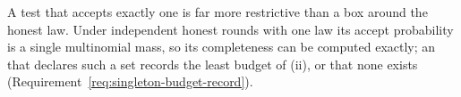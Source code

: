 
A test that accepts exactly one  is far more
restrictive than a box around the honest law. Under independent honest
rounds with one law its accept probability is a single multinomial mass, so
its completeness can be computed exactly; an  that declares such
a set records the least budget of (ii), or that none exists
(Requirement~\ref{req:singleton-budget-record}).

